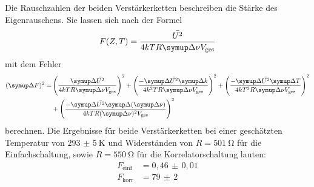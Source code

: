Die Rauschzahlen der beiden Verstärkerketten beschreiben die Stärke des Eigenrauschens. Sie lassen sich nach der Formel
%
\begin{equation}
  F(Z,T)=\frac{\bar{U^2}}{4kTR\upD\nu V_\text{ges}}
\end{equation}
%
mit dem Fehler
%
\begin{align*}
  (\upD F)^2=&\left(\frac{\upD \bar{U^2}}{4kTR\upD\nu V_\text{ges}}\right)^2+\left(\frac{-\upD \bar{U^2}\upD k}{4k^2TR\upD\nu V_\text{ges}}\right)^2+\left(\frac{-\upD \bar{U^2}\upD T}{4kT^2R\upD\nu V_\text{ges}}\right)^2 \\
  &+\left(\frac{-\upD \bar{U^2}\upD(\upD\nu)}{4kTR(\upD\nu)^2 V_\text{ges}}\right)^2
\end{align*}
%
berechnen. Die Ergebnisse für beide Verstärkerketten bei einer geschätzten Temperatur von $\SI{293(5)}{\kelvin}$ und Widerständen von $R=\SI{501}{\ohm}$ für die Einfachschaltung, sowie $R=\SI{550}{\ohm}$ für die Korrelatorschaltung lauten:
%
\begin{align*}
  F_\text{einf}&=0,46\,\pm\,0,01 \\
  F_\text{korr}&=79\,\pm\,2
\end{align*}
